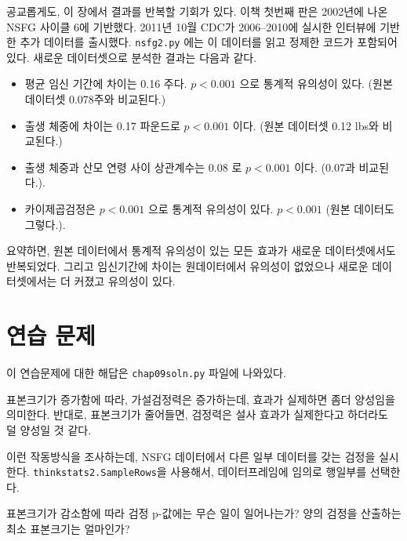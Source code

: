 공교롭게도, 이 장에서 결과를 반복할 기회가 있다.
이책 첫번째 판은 2002년에 나온 NSFG 사이클 6에 기반했다.
2011년 10월 CDC가 2006--2010에 실시한 인터뷰에 기반한 추가 데이터를 출시했다. {\tt nsfg2.py} 에는 이 데이터를 읽고 정제한 코드가 포함되어 있다. 새로운 데이터셋으로 분석한 결과는 다음과 같다.

\begin{itemize}

\item 평균 임신 기간에 차이는 0.16 주다. $p < 0.001$ 으로 통계적 유의성이 있다. (원본 데이터셋 0.078주와 비교된다.)


\item 출생 체중에 차이는 0.17 파운드로 $p < 0.001$ 이다.
(원본 데이터셋 0.12 lbs와 비교된다.)

\item 출생 체중과 산모 연령 사이 상관계수는 0.08 로 $p < 0.001$ 이다. (0.07과 비교된다.).

\item 카이제곱검정은 $p < 0.001$ 으로 통계적 유의성이 있다.
$p < 0.001$ (원본 데이터도 그렇다.).

\end{itemize}

요약하면, 원본 데이터에서 통계적 유의성이 있는 모든 효과가 새로운 데이터셋에서도 반복되었다. 그리고 임신기간에 차이는 원데이터에서 유의성이 없었으나 새로운 데이터셋에서는 더 커졌고 유의성이 있다.


\section{연습 문제}

이 연습문제에 대한 해답은 \verb"chap09soln.py" 파일에 나와있다.

\begin{exercise}
표본크기가 증가함에 따라, 가설검정력은 증가하는데,
효과가 실제하면 좀더 양성임을 의미한다.
반대로, 표본크기가 줄어들면, 검정력은 설사 효과가 실제한다고 하더라도 덜 양성일 것 같다.

이런 작동방식을 조사하는데, NSFG 데이터에서 다른 일부 데이터를 갖는 검정을 실시한다.
{\tt thinkstats2.SampleRows}을 사용해서, 데이터프레임에 임의로 행일부를 선택한다.


표본크기가 감소함에 따라 검정 p-값에는 무슨 일이 일어나는가?
양의 검정을 산출하는 최소 표본크기는 얼마인가?

\end{exercise}


